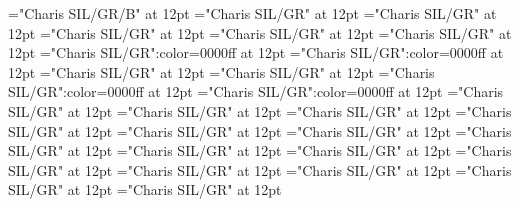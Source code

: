 \documentclass[a4paper,twoside]{article}
\begin{document}
\font\NoteTargetReferencezxxNoteGeneralParagraphParagraphscrSectioncolumnsscrBookscrBody="Charis SIL/GR/B" at 12pt
\font\footnotequeryzxxNoteGeneralParagraphParagraphscrSectioncolumnsscrBookscrBody="Charis SIL/GR" at 12pt
\font\ftzxxNoteGeneralParagraphParagraphscrSectioncolumnsscrBookscrBody="Charis SIL/GR" at 12pt
\font\LinebscrSectioncolumnsscrBookscrBody="Charis SIL/GR" at 12pt
\font\VerseNumberzxxLinebscrSectioncolumnsscrBookscrBody="Charis SIL/GR" at 12pt
\font\spanzxxLinebscrSectioncolumnsscrBookscrBody="Charis SIL/GR" at 12pt
\font\SeeInGlossaryzxxLinebscrSectioncolumnsscrBookscrBody="Charis SIL/GR":color=0000ff at 12pt
\font\GlossaryKeySeeInGlossaryzxxLinebscrSectioncolumnsscrBookscrBody="Charis SIL/GR":color=0000ff at 12pt
\font\LinecscrSectioncolumnsscrBookscrBody="Charis SIL/GR" at 12pt
\font\spanzxxLinecscrSectioncolumnsscrBookscrBody="Charis SIL/GR" at 12pt
\font\SeeInGlossaryzxxParagraphscrSectioncolumnsscrBookscrBody="Charis SIL/GR":color=0000ff at 12pt
\font\GlossaryKeySeeInGlossaryzxxParagraphscrSectioncolumnsscrBookscrBody="Charis SIL/GR":color=0000ff at 12pt
\font\picturePageParagraphscrSectioncolumnsscrBookscrBody="Charis SIL/GR" at 12pt
\font\picturepicturePageParagraphscrSectioncolumnsscrBookscrBody="Charis SIL/GR" at 12pt
\font\pictureCaptionzxxpicturePageParagraphscrSectioncolumnsscrBookscrBody="Charis SIL/GR" at 12pt
\font\spanzxxpictureCaptionzxxpicturePageParagraphscrSectioncolumnsscrBookscrBody="Charis SIL/GR" at 12pt
\font{}="Charis SIL/GR" at 12pt
\font\pictureColumnParagraphscrSectioncolumnsscrBookscrBody="Charis SIL/GR" at 12pt
\font\picturepictureColumnParagraphscrSectioncolumnsscrBookscrBody="Charis SIL/GR" at 12pt
\font\pictureCaptionzxxpictureColumnParagraphscrSectioncolumnsscrBookscrBody="Charis SIL/GR" at 12pt
\font\spanzxxpictureCaptionzxxpictureColumnParagraphscrSectioncolumnsscrBookscrBody="Charis SIL/GR" at 12pt
\font{}="Charis SIL/GR" at 12pt
\font\ParagraphContinuationscrSectioncolumnsscrBookscrBody="Charis SIL/GR" at 12pt
\font\VerseNumberzxxParagraphContinuationscrSectioncolumnsscrBookscrBody="Charis SIL/GR" at 12pt
\font\spanzxxParagraphContinuationscrSectioncolumnsscrBookscrBody="Charis SIL/GR" at 12pt
\font\footnotequeryazxxNoteGeneralParagraphParagraphscrSectioncolumnsscrBookscrBody="Charis SIL/GR" at 12pt
\color{black} 
\end{document}
